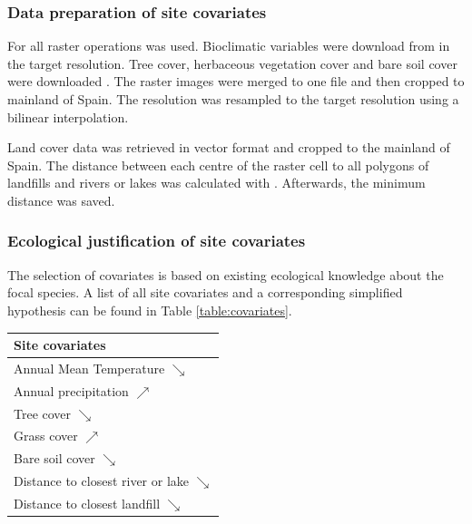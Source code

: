 \begin{multicols}{2}
\subsubsection*{Data preparation of site covariates}
For all raster operations \textcite{raster} was used. Bioclimatic variables were download from \textcite{Fick2017} in the target resolution. Tree cover, herbaceous vegetation cover and bare soil cover were downloaded \parencite{Buchhorn2020, land_cover_data}. The raster images were merged to one file and then cropped to mainland of Spain. The resolution was resampled to the target resolution using a bilinear interpolation.

Land cover data was retrieved in vector format \parencite{clc2018} and cropped to the mainland of Spain. The distance between each centre of the raster cell to all polygons of landfills and rivers or lakes was calculated with \textcite{rgeos}. Afterwards, the minimum distance was saved.  


\subsubsection*{Ecological justification of site covariates}
The selection of covariates is based on existing ecological knowledge about the focal species. A list of all site covariates and a corresponding simplified hypothesis can be found in Table \ref{table:covariates}.

\begin{center}
	\begin{tabular}{l}
		\toprule
		\textbf{Site covariates}\\ \midrule 
		Annual Mean Temperature $\searrow$  \\
		Annual precipitation $\nearrow$ \\
		Tree cover  $\searrow$ \\
		Grass cover $\nearrow$ \\
		Bare soil cover   $\searrow$ \\
		Distance to closest river or lake  $\searrow$ \\
		Distance to closest landfill  $\searrow$ \\
		\bottomrule
	\end{tabular}
	\label{table:covariates}
\end{center}	


\end{multicols}

